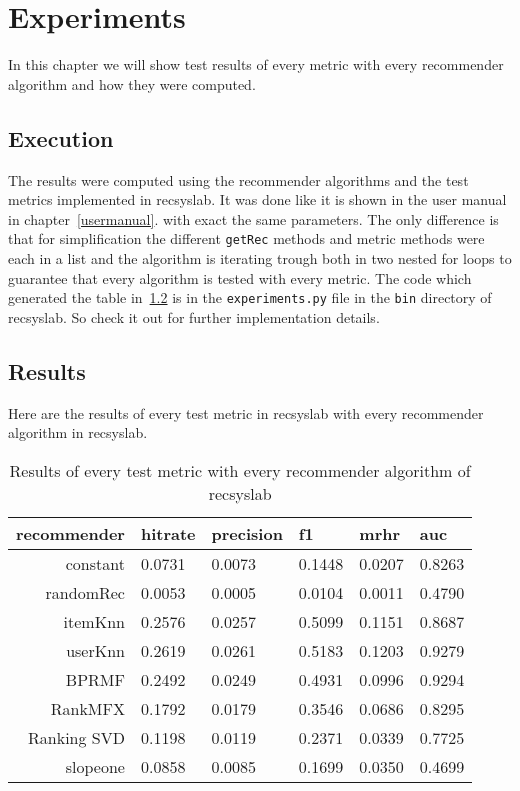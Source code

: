 \chapter{Experiments}
\label{experiments}
In this chapter we will show test results of every metric with every
recommender algorithm and how they were computed.


\section{Execution}
The results were computed using the recommender algorithms and 
the test metrics implemented in recsyslab. It was done 
like it is shown in the user manual in chapter~\ref{usermanual}.
with exact the same parameters.
The only difference is that for simplification the different
\lstinline!getRec! methods and metric methods were each in a list and the 
algorithm is iterating trough both in two nested for loops
to guarantee that every algorithm is tested with every metric.
The code which generated the table in~\ref{results} is in 
the \lstinline!experiments.py! file in the \lstinline!bin! directory of recsyslab.
So check it out for further implementation details.


\section{Results}
\label{results}
Here are the results of every test metric in recsyslab
with every recommender algorithm in recsyslab.

\begin{table}[h]
\begin{tabular}{rlllll}
    recommender  & hitrate & precision & f1 & mrhr & auc \\ \midrule
    constant & 0.0731 & 0.0073 & 0.1448 & 0.0207 & 0.8263 \\
    randomRec & 0.0053 & 0.0005 & 0.0104 & 0.0011 & 0.4790 \\
    itemKnn & 0.2576 & 0.0257 & 0.5099 & 0.1151 & 0.8687 \\
    userKnn & 0.2619 & 0.0261 & 0.5183 & 0.1203 & 0.9279 \\
    BPRMF& 0.2492 & 0.0249 & 0.4931 & 0.0996 & 0.9294 \\
    RankMFX & 0.1792 & 0.0179 & 0.3546 & 0.0686 & 0.8295 \\
    Ranking SVD & 0.1198 & 0.0119 & 0.2371 & 0.0339 & 0.7725 \\
    slopeone & 0.0858 & 0.0085 & 0.1699 & 0.0350 & 0.4699 \\ \bottomrule
\end{tabular}
\caption{Results of every test metric with every recommender algorithm of recsyslab}
\end{table}
\newpage
